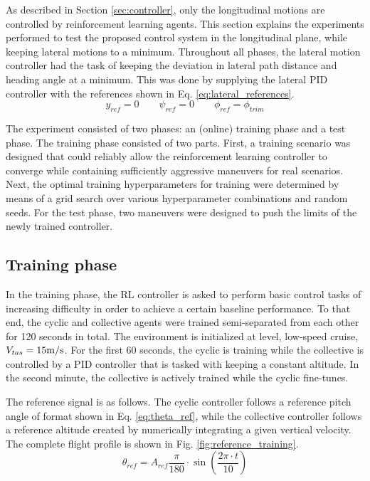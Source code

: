 As described in Section \ref{sec:controller}, only the longitudinal motions are controlled by reinforcement learning agents. This section explains the experiments performed to test the proposed control system in the longitudinal plane, while keeping lateral motions to a minimum. Throughout all phases, the lateral motion controller had the task of keeping the deviation in lateral path distance and heading angle at a minimum. This was done by supplying the lateral PID controller with the references shown in Eq. \eqref{eq:lateral_references}.
\begin{equation} \label{eq:lateral_references}
    y_{ref} = 0 \qquad \psi_{ref} = 0 \qquad \phi_{ref} = \phi_{trim}
\end{equation}

The experiment consisted of two phases: an (online) training phase and a test phase. The training phase consisted of two parts. First, a training scenario was designed that could reliably allow the reinforcement learning controller to converge while containing sufficiently aggressive maneuvers for real scenarios. Next, the optimal training hyperparameters  for training were determined by means of a grid search over various hyperparameter combinations and random seeds. For the test phase, two maneuvers were designed to push the limits of the newly trained controller. 

\subsection{Training phase} \label{ssec:trainingphase}

In the training phase, the RL controller is asked to perform basic control tasks of increasing difficulty in order to achieve a certain baseline performance. To that end, the cyclic and collective agents were trained semi-separated from each other for 120 seconds in total. The environment is initialized at level, low-speed cruise, $V_{tas} = 15\si[per-mode=symbol]{\meter \per \second}$. For the first 60 seconds, the cyclic is training while the collective is controlled by a PID controller that is tasked with keeping a constant altitude. In the second minute, the collective is actively trained while the cyclic fine-tunes. 

The reference signal is as follows. 
The cyclic controller follows a reference pitch angle of format shown in Eq. \eqref{eq:theta_ref}, while the collective controller follows a reference altitude created by numerically integrating a given vertical velocity. The complete flight profile is shown in Fig. \ref{fig:reference_training}. 
\begin{equation} \label{eq:theta_ref}
    \theta_{ref} = A_{ref} \frac{\pi}{180} \cdot \sin\left(\frac{2 \pi\cdot t}{10} \right)
\end{equation}

